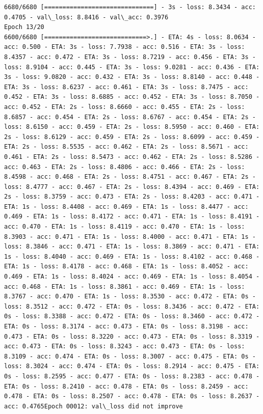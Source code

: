 \documentclass[11pt]{article}
\begin{document}
\begin{Verbatim}[commandchars=\\\{\}]
6680/6680 [==============================] - 3s - loss: 8.3434 - acc: 0.4705 - val\_loss: 8.8416 - val\_acc: 0.3976
Epoch 13/20
6600/6680 [============================>.] - ETA: 4s - loss: 8.0634 - acc: 0.500 - ETA: 3s - loss: 7.7938 - acc: 0.516 - ETA: 3s - loss: 8.4357 - acc: 0.472 - ETA: 3s - loss: 8.7219 - acc: 0.456 - ETA: 3s - loss: 8.9104 - acc: 0.445 - ETA: 3s - loss: 9.0281 - acc: 0.436 - ETA: 3s - loss: 9.0820 - acc: 0.432 - ETA: 3s - loss: 8.8140 - acc: 0.448 - ETA: 3s - loss: 8.6237 - acc: 0.461 - ETA: 3s - loss: 8.7475 - acc: 0.452 - ETA: 3s - loss: 8.6885 - acc: 0.452 - ETA: 3s - loss: 8.7050 - acc: 0.452 - ETA: 2s - loss: 8.6660 - acc: 0.455 - ETA: 2s - loss: 8.6857 - acc: 0.454 - ETA: 2s - loss: 8.6767 - acc: 0.454 - ETA: 2s - loss: 8.6150 - acc: 0.459 - ETA: 2s - loss: 8.5950 - acc: 0.460 - ETA: 2s - loss: 8.6129 - acc: 0.459 - ETA: 2s - loss: 8.6099 - acc: 0.459 - ETA: 2s - loss: 8.5535 - acc: 0.462 - ETA: 2s - loss: 8.5671 - acc: 0.461 - ETA: 2s - loss: 8.5473 - acc: 0.462 - ETA: 2s - loss: 8.5286 - acc: 0.463 - ETA: 2s - loss: 8.4806 - acc: 0.466 - ETA: 2s - loss: 8.4598 - acc: 0.468 - ETA: 2s - loss: 8.4751 - acc: 0.467 - ETA: 2s - loss: 8.4777 - acc: 0.467 - ETA: 2s - loss: 8.4394 - acc: 0.469 - ETA: 2s - loss: 8.3759 - acc: 0.473 - ETA: 2s - loss: 8.4203 - acc: 0.471 - ETA: 1s - loss: 8.4408 - acc: 0.469 - ETA: 1s - loss: 8.4477 - acc: 0.469 - ETA: 1s - loss: 8.4172 - acc: 0.471 - ETA: 1s - loss: 8.4191 - acc: 0.470 - ETA: 1s - loss: 8.4119 - acc: 0.470 - ETA: 1s - loss: 8.3903 - acc: 0.471 - ETA: 1s - loss: 8.4000 - acc: 0.471 - ETA: 1s - loss: 8.3846 - acc: 0.471 - ETA: 1s - loss: 8.3869 - acc: 0.471 - ETA: 1s - loss: 8.4040 - acc: 0.469 - ETA: 1s - loss: 8.4102 - acc: 0.468 - ETA: 1s - loss: 8.4178 - acc: 0.468 - ETA: 1s - loss: 8.4052 - acc: 0.469 - ETA: 1s - loss: 8.4024 - acc: 0.469 - ETA: 1s - loss: 8.4054 - acc: 0.468 - ETA: 1s - loss: 8.3861 - acc: 0.469 - ETA: 1s - loss: 8.3767 - acc: 0.470 - ETA: 1s - loss: 8.3530 - acc: 0.472 - ETA: 0s - loss: 8.3512 - acc: 0.472 - ETA: 0s - loss: 8.3436 - acc: 0.472 - ETA: 0s - loss: 8.3388 - acc: 0.472 - ETA: 0s - loss: 8.3460 - acc: 0.472 - ETA: 0s - loss: 8.3174 - acc: 0.473 - ETA: 0s - loss: 8.3198 - acc: 0.473 - ETA: 0s - loss: 8.3220 - acc: 0.473 - ETA: 0s - loss: 8.3319 - acc: 0.473 - ETA: 0s - loss: 8.3243 - acc: 0.473 - ETA: 0s - loss: 8.3109 - acc: 0.474 - ETA: 0s - loss: 8.3007 - acc: 0.475 - ETA: 0s - loss: 8.3024 - acc: 0.474 - ETA: 0s - loss: 8.2914 - acc: 0.475 - ETA: 0s - loss: 8.2595 - acc: 0.477 - ETA: 0s - loss: 8.2383 - acc: 0.478 - ETA: 0s - loss: 8.2410 - acc: 0.478 - ETA: 0s - loss: 8.2459 - acc: 0.478 - ETA: 0s - loss: 8.2507 - acc: 0.478 - ETA: 0s - loss: 8.2637 - acc: 0.4765Epoch 00012: val\_loss did not improve

\end{Verbatim}
\end{document}
